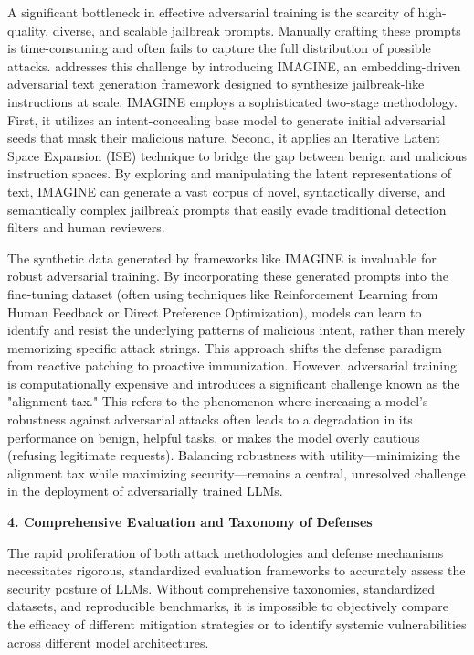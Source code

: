 \documentclass[11pt,a4paper]{article}
\begin{document}
A significant bottleneck in effective adversarial training is the scarcity of high-quality, diverse, and scalable jailbreak prompts. Manually crafting these prompts is time-consuming and often fails to capture the full distribution of possible attacks. \cite{Liu_2025_LLM} addresses this challenge by introducing IMAGINE, an embedding-driven adversarial text generation framework designed to synthesize jailbreak-like instructions at scale. IMAGINE employs a sophisticated two-stage methodology. First, it utilizes an intent-concealing base model to generate initial adversarial seeds that mask their malicious nature. Second, it applies an Iterative Latent Space Expansion (ISE) technique to bridge the gap between benign and malicious instruction spaces. By exploring and manipulating the latent representations of text, IMAGINE can generate a vast corpus of novel, syntactically diverse, and semantically complex jailbreak prompts that easily evade traditional detection filters and human reviewers. 

The synthetic data generated by frameworks like IMAGINE is invaluable for robust adversarial training. By incorporating these generated prompts into the fine-tuning dataset (often using techniques like Reinforcement Learning from Human Feedback or Direct Preference Optimization), models can learn to identify and resist the underlying patterns of malicious intent, rather than merely memorizing specific attack strings. This approach shifts the defense paradigm from reactive patching to proactive immunization. However, adversarial training is computationally expensive and introduces a significant challenge known as the "alignment tax." This refers to the phenomenon where increasing a model's robustness against adversarial attacks often leads to a degradation in its performance on benign, helpful tasks, or makes the model overly cautious (refusing legitimate requests). Balancing robustness with utility---minimizing the alignment tax while maximizing security---remains a central, unresolved challenge in the deployment of adversarially trained LLMs.

\textbf{4. Comprehensive Evaluation and Taxonomy of Defenses}

The rapid proliferation of both attack methodologies and defense mechanisms necessitates rigorous, standardized evaluation frameworks to accurately assess the security posture of LLMs. Without comprehensive taxonomies, standardized datasets, and reproducible benchmarks, it is impossible to objectively compare the efficacy of different mitigation strategies or to identify systemic vulnerabilities across different model architectures.
\end{document}
